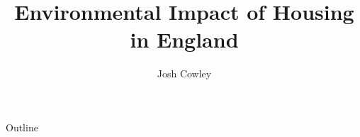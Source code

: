 \documentclass[aspectratio=43,12pt]{beamer}
\title{Environmental Impact of Housing in England}
\author{Josh Cowley}
\date[May 4th, 2022]{}
\begin{document}
\begin{frame}
    \titlepage
\end{frame}

\begin{frame}{Outline}
    \tableofcontents
\end{frame}





\end{document}
